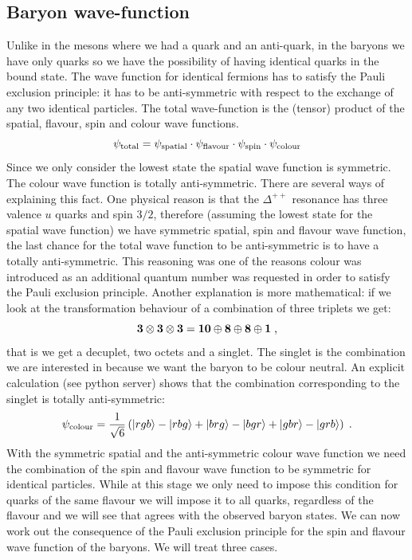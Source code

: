 \documentclass[12pt]{article}
\begin{document}
\subsection{Baryon wave-function}
Unlike in the mesons where we had a quark and an anti-quark, in the baryons we have only quarks so we have the possibility of having identical quarks in the bound state. The wave function for identical fermions has to satisfy the Pauli exclusion principle: it has to be anti-symmetric with respect to the exchange of any two identical particles. The total wave-function is the (tensor) product of the spatial, flavour, spin and colour wave functions.
\[\psi_{\rm total}
=
\psi_{\rm spatial}\cdot
\psi_{\rm flavour}\cdot
\psi_{\rm spin}\cdot
\psi_{\rm colour}
\] 
Since we only consider the lowest state the spatial wave function is symmetric. The colour wave function is totally anti-symmetric. There are several ways of explaining this fact. One physical reason is that the $\Delta^{++}$ resonance has three valence $u$ quarks and spin $3/2$, therefore (assuming the lowest state for the spatial wave function) we have symmetric spatial, spin and flavour wave function, the last chance for the total wave function to be anti-symmetric is to have a totally anti-symmetric. This reasoning was one of the reasons colour was introduced as an additional quantum number was requested in order to satisfy the Pauli exclusion principle. Another explanation is more mathematical: if we look at the transformation behaviour of a combination of three triplets we get:
\[\bf 3 \otimes 3 \otimes 3 = 10\oplus 8 \oplus 8\oplus 1\;,\]
that is we get a decuplet, two octets and a singlet. The singlet is the combination we are interested in because we want the baryon to be colour neutral. An explicit calculation (see python server) shows that the combination corresponding to the singlet is totally anti-symmetric:
\[\psi_{\rm colour}=\frac{1}{\sqrt{6}}\left(
\left|rgb\right>
-\left|rbg\right>
+\left|brg\right>
-\left|bgr\right>
+\left|gbr\right>
-\left|grb\right>
\right)\;.\]   
With the symmetric spatial and the anti-symmetric colour wave function we need the combination of the spin and flavour wave function to be symmetric for identical particles. While at this stage we only need to impose this condition for quarks of the same flavour we will impose it to all quarks, regardless of the flavour and we will see that agrees with the observed baryon states. We can now work out the consequence of the Pauli exclusion principle for the spin and flavour wave function of the baryons. We will treat three cases.
\end{document}
